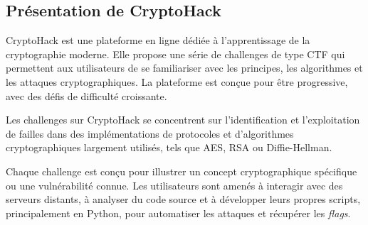 \subsection{Présentation de CryptoHack}
CryptoHack est une plateforme en ligne dédiée à l'apprentissage de la
cryptographie moderne. Elle propose une série de challenges de type CTF qui
permettent aux utilisateurs de se familiariser avec les principes, les
algorithmes et les attaques cryptographiques. La plateforme est conçue pour
être progressive, avec des défis de difficulté croissante.

Les challenges sur CryptoHack se concentrent sur l'identification et
l'exploitation de failles dans des implémentations de protocoles et
d'algorithmes cryptographiques largement utilisés, tels que AES, RSA ou
Diffie-Hellman.

Chaque challenge est conçu pour illustrer un concept cryptographique
spécifique ou une vulnérabilité connue. Les utilisateurs sont amenés à
interagir avec des serveurs distants, à analyser du code source et à
développer leurs propres scripts, principalement en Python, pour automatiser
les attaques et récupérer les \textit{flags}.
